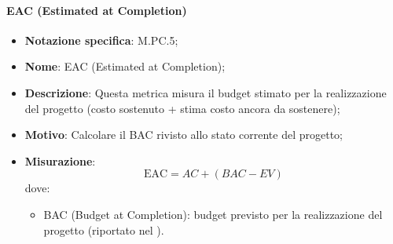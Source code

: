 \paragraph*{EAC (Estimated at Completion)}
\begin{itemize}
    \item \textbf{Notazione specifica}: M.PC.5;
    \item \textbf{Nome}: EAC (Estimated at Completion);
    \item \textbf{Descrizione}: Questa metrica misura il budget stimato per la realizzazione del progetto (costo sostenuto + stima costo ancora da sostenere);
    \item \textbf{Motivo}: Calcolare il BAC rivisto allo stato corrente del progetto;
    \item \textbf{Misurazione}:
    \[
        \text{EAC} = \textit{AC} + (\textit{BAC} - \textit{EV})
    \]
    dove:
    \begin{itemize}
        \item BAC (Budget at Completion): budget previsto per la realizzazione del progetto (riportato nel \PianoDiProgetto).
    \end{itemize}
\end{itemize}
